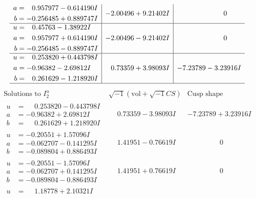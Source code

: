 \documentclass[1p]{elsarticle_modified}
\theoremstyle{definition}
\newcommand{\I}{\sqrt{-1}}
\begin{document}
$$\begin{array}{c|c|c}
\begin{aligned}
a &= \phantom{-}0.957977 - 0.614190 I \\
b &= -0.256485 + 0.889747 I\end{aligned}
 & -2.00496 + 9.21402 I & \phantom{-0.000000 } 0 \\ \hline\begin{aligned}
u &= \phantom{-}0.45763 - 1.38922 I \\
a &= \phantom{-}0.957977 + 0.614190 I \\
b &= -0.256485 - 0.889747 I\end{aligned}
 & -2.00496 - 9.21402 I & \phantom{-0.000000 } 0 \\ \hline\begin{aligned}
u &= \phantom{-}0.253820 + 0.443798 I \\
a &= -0.96382 - 2.69812 I \\
b &= \phantom{-}0.261629 - 1.218920 I\end{aligned}
 & \phantom{-}0.73359 + 3.98093 I & -7.23789 - 3.23916 I\\
 \hline 
 \end{array}$$\newpage$$\begin{array}{c|c|c}  
\text{Solutions to }I^u_{2}& \I (\text{vol} + \sqrt{-1}CS) & \text{Cusp shape}\\
 \hline 
\begin{aligned}
u &= \phantom{-}0.253820 - 0.443798 I \\
a &= -0.96382 + 2.69812 I \\
b &= \phantom{-}0.261629 + 1.218920 I\end{aligned}
 & \phantom{-}0.73359 - 3.98093 I & -7.23789 + 3.23916 I \\ \hline\begin{aligned}
u &= -0.20551 + 1.57096 I \\
a &= -0.062707 - 0.141295 I \\
b &= -0.089804 + 0.886493 I\end{aligned}
 & \phantom{-}1.41951 - 0.76619 I & \phantom{-0.000000 } 0 \\ \hline\begin{aligned}
u &= -0.20551 - 1.57096 I \\
a &= -0.062707 + 0.141295 I \\
b &= -0.089804 - 0.886493 I\end{aligned}
 & \phantom{-}1.41951 + 0.76619 I & \phantom{-0.000000 } 0 \\ \hline\begin{aligned}
u &= \phantom{-}1.18778 + 2.10321 I \\

\end{aligned}
\end{array}$$
\end{document}
